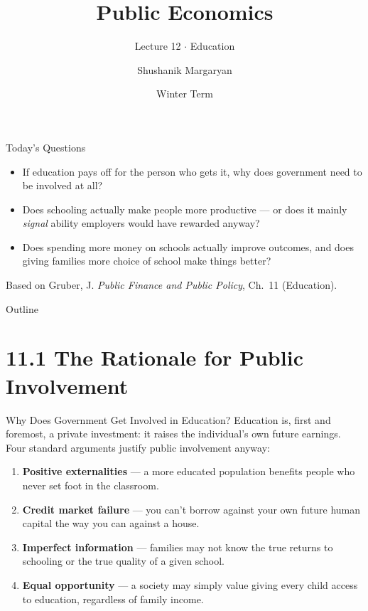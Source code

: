 \documentclass[11pt,aspectratio=169]{beamer}
\title{Public Economics}
\subtitle{Lecture 12 \(\cdot\) Education}
\author{Shushanik Margaryan}
\institute{WU Vienna University of Economics and Business}
\date{Winter Term}
\begin{document}
\begin{frame}
  \titlepage
\end{frame}

\begin{frame}{Today's Questions}
  \begin{itemize}
    \item If education pays off for the person who gets it, why does government need to be involved at all?
    \item Does schooling actually make people more productive --- or does it mainly \emph{signal} ability employers would have rewarded anyway?
    \item Does spending more money on schools actually improve outcomes, and does giving families more choice of school make things better?
  \end{itemize}
  \vspace{1em}
  \begin{block}{Based on}
    Gruber, J. \emph{Public Finance and Public Policy}, Ch.\ 11 (Education).
  \end{block}
\end{frame}

\begin{frame}{Outline}
  \tableofcontents
\end{frame}

\section{11.1 The Rationale for Public Involvement}

\begin{frame}{Why Does Government Get Involved in Education?}
  Education is, first and foremost, a private investment: it raises the individual's own future earnings. Four standard arguments justify public involvement anyway:
  \begin{enumerate}
    \item \textbf{Positive externalities} --- a more educated population benefits people who never set foot in the classroom.
    \item \textbf{Credit market failure} --- you can't borrow against your own future human capital the way you can against a house.
    \item \textbf{Imperfect information} --- families may not know the true returns to schooling or the true quality of a given school.
    \item \textbf{Equal opportunity} --- a society may simply value giving every child access to education, regardless of family income.
  \end{enumerate}
\end{frame}
\end{document}
